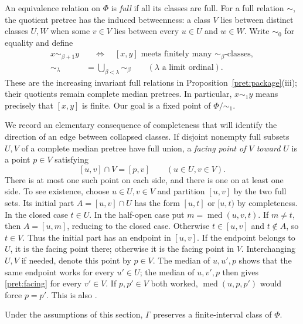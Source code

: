 An equivalence relation on $\Phi$ is \emph{full} if all its classes are full.
For a full relation $\sim$, the quotient pretree has the induced
betweenness: a class $V$ lies between distinct classes $U,W$ when some
$v\in V$ lies between every $u\in U$ and $w\in W$.
Write $\sim_0$ for equality and define
\begin{equation}\label{pret:relations}
 \begin{aligned}
 x\sim_{\beta+1}y
 &\quad\Longleftrightarrow\quad
 [x,y]\text{ meets finitely many }\sim_\beta\text{-classes},\\
 \sim_\lambda&=\bigcup_{\beta<\lambda}\sim_\beta
 \qquad(\lambda\text{ a limit ordinal}).
 \end{aligned}
\end{equation}
These are the increasing invariant full relations in
Proposition~\ref{pret:package}\textup{(iii)}; their quotients remain
complete median pretrees.  In particular,
$x\sim_1y$ means precisely that $[x,y]$ is finite. Our goal is a fixed point of $\Phi/\sim_1$.

We record an elementary consequence of completeness that will identify
the direction of an edge between collapsed classes.  If disjoint
nonempty full subsets $U,V$ of a complete median pretree have full union,
a \emph{facing point of $V$ toward $U$} is a point $p\in V$ satisfying
\begin{equation}\label{pret:facing}
 [u,v]\cap V=[p,v]\qquad(u\in U, v\in V).
\end{equation}
There is at most one such point on each side, and there is one on at
least one side.  To see existence, choose $u\in U,v\in V$ and partition
$[u,v]$ by the two full sets.  Its initial part $A=[u,v]\cap U$ has
the form $[u,t]$ or $[u,t)$ by completeness.  In the closed case
$t\in U$.  In the half-open case put $m=\operatorname{med}(u,v,t)$.
If $m\ne t$, then $A=[u,m]$, reducing to the closed case.
Otherwise $t\in[u,v]$ and $t\notin A$, so $t\in V$.
Thus the initial part has an endpoint in $[u,v]$.  If the endpoint
belongs to $U$, it is the facing point there; otherwise it is the
facing point in $V$.  Interchanging $U,V$ if needed, denote this point
by $p\in V$.
The median of $u,u',p$ shows that the same endpoint works for every
$u'\in U$; the median of $u,v',p$ then gives
\eqref{pret:facing} for every $v'\in V$.  If $p,p'\in V$ both worked,
$\operatorname{med}(u,p,p')$ would force $p=p'$.  This is also
\cite[Lemma~6.13]{Bowditch1999Treelike}.

\begin{lemma}\label{pret:invariant-class}
Under the assumptions of this section, $\Gamma$ preserves a
finite-interval class of $\Phi$.
\end{lemma}

